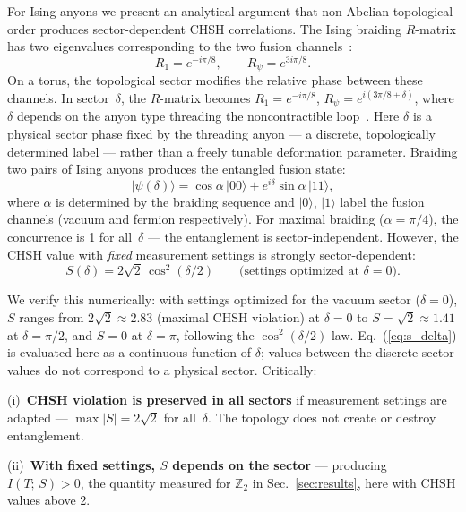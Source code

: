 \documentclass[aps,pra,twocolumn,superscriptaddress,showpacs,floatfix]{revtex4-2}
\newcommand{\ket}[1]{| #1 \rangle}
\newcommand{\Ztwo}{\mathbb{Z}_2}
\newcommand{\MI}{I(T;\,S)}
\begin{document}
For Ising anyons we present an analytical argument that non-Abelian
topological order produces sector-dependent CHSH correlations. The Ising
braiding $R$-matrix has
two eigenvalues corresponding to the two fusion channels~\cite{Nayak2008,Kitaev2006}:
\begin{equation}
  R_1 = e^{-i\pi/8}, \qquad R_\psi = e^{3i\pi/8}.
  \label{eq:ising_r}
\end{equation}
On a torus, the topological sector modifies the relative phase between these
channels. In sector~$\delta$, the $R$-matrix becomes
$R_1 = e^{-i\pi/8}$, $R_\psi = e^{i(3\pi/8 + \delta)}$, where $\delta$ depends
on the anyon type threading the noncontractible loop~\cite{Kitaev2003,Kitaev2006}.
Here $\delta$ is a physical sector phase fixed by the threading anyon --- a
discrete, topologically determined label --- rather than a freely tunable
deformation parameter.
Braiding two pairs of Ising anyons produces the entangled fusion state:
\begin{equation}
  \ket{\psi(\delta)} = \cos\alpha\,\ket{00} + e^{i\delta}\sin\alpha\,\ket{11},
  \label{eq:ising_state}
\end{equation}
where $\alpha$ is determined by the braiding sequence and $\ket{0}$, $\ket{1}$
label the fusion channels (vacuum and fermion respectively). For maximal braiding
($\alpha = \pi/4$), the concurrence is 1 for all~$\delta$ --- the entanglement is
sector-independent. However, the CHSH value with \emph{fixed} measurement settings
is strongly sector-dependent:
\begin{equation}
  S(\delta) = 2\sqrt{2}\,\cos^2(\delta/2)
  \qquad\text{(settings optimized at $\delta{=}0$)}.
  \label{eq:s_delta}
\end{equation}

We verify this numerically: with settings optimized for the vacuum sector
($\delta = 0$), $S$ ranges from $2\sqrt{2} \approx 2.83$ (maximal CHSH violation)
at $\delta = 0$ to $S = \sqrt{2} \approx 1.41$ at $\delta = \pi/2$, and $S = 0$
at $\delta = \pi$, following the $\cos^2(\delta/2)$ law.
Eq.~(\ref{eq:s_delta}) is evaluated here as a continuous function of $\delta$;
values between the discrete sector values do not correspond to a physical
sector. Critically:

(i)~\textbf{CHSH violation is preserved in all sectors} if measurement settings
are adapted --- $\max|S| = 2\sqrt{2}$ for all~$\delta$. The topology does not
create or destroy entanglement.

(ii)~\textbf{With fixed settings, $S$ depends on the sector} --- producing
$\MI > 0$, the quantity measured for $\Ztwo$ in Sec.~\ref{sec:results}, here
with CHSH values above 2.
\end{document}
